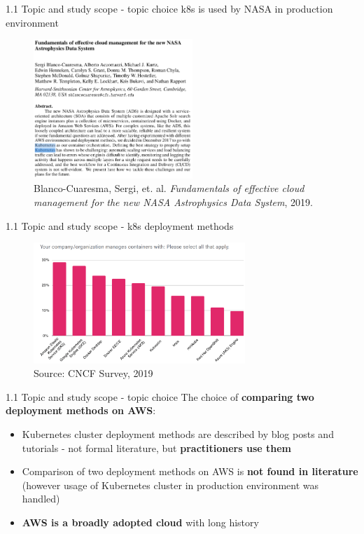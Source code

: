 \documentclass{beamer}
\begin{document}
\begin{frame}{1.1 Topic and study scope - topic choice}%
k8s is used by NASA in production environment
\begin{center}
	\begin{figure}
		\includegraphics[width=6cm]{figures/k8s-used-by-nasa.png}
		\label{fig:k8s-used-by-nasa}
		\\
		\tiny{Blanco-Cuaresma, Sergi, et. al. \textit{Fundamentals of effective cloud management for the new NASA Astrophysics Data System}, 2019.}
	\end{figure}	
\end{center}
\end{frame}

\begin{frame}{1.1 Topic and study scope - k8s deployment methods}%
\begin{center}
	\begin{figure}
	\includegraphics[width=8cm]{figures/cncf-k8s-deployment-methods.png}
	\label{fig:cncf-k8s-deployment-methods}
	\\
	\tiny{Source: CNCF Survey, 2019}
	\end{figure}	
\end{center}
\end{frame}

\begin{frame}{1.1 Topic and study scope - topic choice}%
The choice of \textbf{comparing two deployment methods on AWS}:
	\begin{itemize}
		\item Kubernetes cluster deployment methods are described by blog posts and tutorials - not formal literature, but \textbf{practitioners use them}
		\item Comparison of two deployment methods on AWS is \textbf{not found in literature} (however usage of Kubernetes cluster in production environment was handled)
		\item \textbf{AWS is a broadly adopted cloud} with long history
	\end{itemize}
\end{frame}
	
\end{document}
